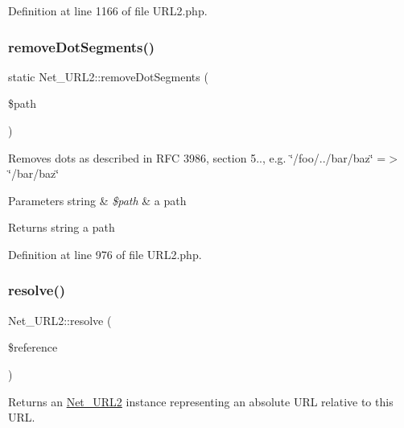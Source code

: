 Definition at line 1166 of file U\+R\+L2.\+php.

\hypertarget{classNet__URL2_aa2ca379f950f6e7a3932121ad39c0e5a}{}\label{classNet__URL2_aa2ca379f950f6e7a3932121ad39c0e5a} 
\subsubsection{\texorpdfstring{remove\+Dot\+Segments()}{removeDotSegments()}}
{\footnotesize\ttfamily static Net\+\_\+\+U\+R\+L2\+::remove\+Dot\+Segments (\begin{DoxyParamCaption}\item[{}]{\$path }\end{DoxyParamCaption})\hspace{0.3cm}{\ttfamily [static]}}

Removes dots as described in R\+FC 3986, section 5.., e.\+g. \char`\"{}/foo/../bar/baz\char`\"{} =$>$ \char`\"{}/bar/baz\char`\"{}


\begin{DoxyParams}[1]{Parameters}
string & {\em \$path} & a path\\
\hline
\end{DoxyParams}
\begin{DoxyReturn}{Returns}
string a path 
\end{DoxyReturn}


Definition at line 976 of file U\+R\+L2.\+php.

\hypertarget{classNet__URL2_a8630ab79fad624b2fd5b0df2e9123c0a}{}\label{classNet__URL2_a8630ab79fad624b2fd5b0df2e9123c0a} 
\subsubsection{\texorpdfstring{resolve()}{resolve()}}
{\footnotesize\ttfamily Net\+\_\+\+U\+R\+L2\+::resolve (\begin{DoxyParamCaption}\item[{}]{\$reference }\end{DoxyParamCaption})}

Returns an \hyperlink{classNet__URL2}{Net\+\_\+\+U\+R\+L2} instance representing an absolute U\+RL relative to this U\+RL.


